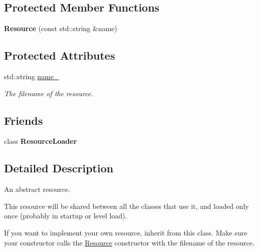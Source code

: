 \subsection*{Protected Member Functions}
\begin{DoxyCompactItemize}
\item 
\mbox{\label{classTarbora_1_1Resource_a7c37d25d519a673529cac26dc179b449}} 
{\bfseries Resource} (const std\+::string \&name)
\end{DoxyCompactItemize}
\subsection*{Protected Attributes}
\begin{DoxyCompactItemize}
\item 
\mbox{\label{classTarbora_1_1Resource_a00dae18f7cf782dabaab704896c52069}} 
std\+::string \hyperlink{classTarbora_1_1Resource_a00dae18f7cf782dabaab704896c52069}{name\+\_\+}
\begin{DoxyCompactList}\small\item\em The filename of the resource. \end{DoxyCompactList}\end{DoxyCompactItemize}
\subsection*{Friends}
\begin{DoxyCompactItemize}
\item 
\mbox{\label{classTarbora_1_1Resource_a685a33b83a13f36aceea3ff940994ac9}} 
class {\bfseries Resource\+Loader}
\end{DoxyCompactItemize}


\subsection{Detailed Description}
An abstract resource. 

This resource will be shared between all the classes that use it, and loaded only once (probably in startup or level load).

If you want to implement your own resource, inherit from this class. Make sure your constructor calls the \hyperlink{classTarbora_1_1Resource}{Resource} constructor with the filename of the resource.

